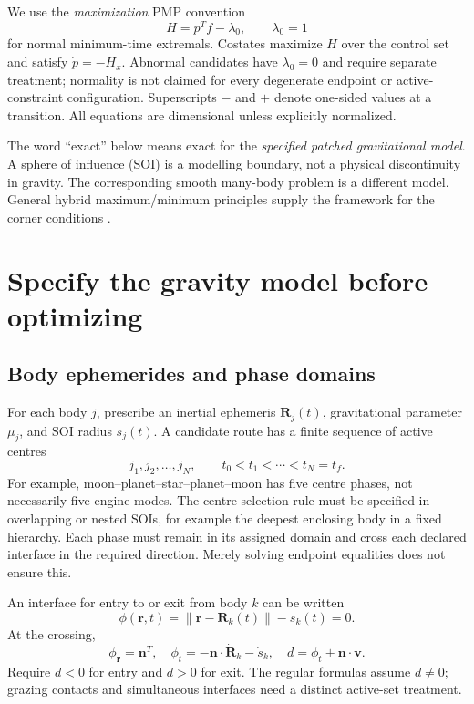 \documentclass[journal, a4paper]{IEEEtran}
\newcommand{\norm}[1]{\left\lVert#1\right\rVert}
\begin{document}
We use the \emph{maximization} PMP convention
\begin{equation}
 H=p^T f-\lambda_0,\qquad \lambda_0=1
 \label{eq:convention}
\end{equation}
for normal minimum-time extremals. Costates maximize $H$ over the control set and satisfy $\dot p=-H_x$. Abnormal candidates have $\lambda_0=0$ and require separate treatment; normality is not claimed for every degenerate endpoint or active-constraint configuration. Superscripts $-$ and $+$ denote one-sided values at a transition. All equations are dimensional unless explicitly normalized.

The word ``exact'' below means exact for the \emph{specified patched gravitational model}. A sphere of influence (SOI) is a modelling boundary, not a physical discontinuity in gravity. The corresponding smooth many-body problem is a different model. General hybrid maximum/minimum principles supply the framework for the corner conditions \cite{pakniyat,pakniyat2024}.

\section{Specify the gravity model before optimizing}
\subsection{Body ephemerides and phase domains}
For each body $j$, prescribe an inertial ephemeris $\mathbf R_j(t)$, gravitational parameter $\mu_j$, and SOI radius $s_j(t)$. A candidate route has a finite sequence of active centres
\begin{equation}
 j_1,j_2,\ldots,j_N,\qquad
 t_0<t_1<\cdots<t_N=t_f.
\end{equation}
For example, moon--planet--star--planet--moon has five centre phases, not necessarily five engine modes. The centre selection rule must be specified in overlapping or nested SOIs, for example the deepest enclosing body in a fixed hierarchy. Each phase must remain in its assigned domain and cross each declared interface in the required direction. Merely solving endpoint equalities does not ensure this.

An interface for entry to or exit from body $k$ can be written
\begin{equation}
 \phi(\mathbf r,t)=\norm{\mathbf r-\mathbf R_k(t)}-s_k(t)=0.
 \label{eq:surface}
\end{equation}
At the crossing,
\begin{equation}
 \phi_{\mathbf r}=\mathbf n^T,\quad
 \phi_t=-\mathbf n\cdot\dot{\mathbf R}_k-\dot s_k,\quad
 d=\phi_t+\mathbf n\cdot\mathbf v.
 \label{eq:crossrate}
\end{equation}
Require $d<0$ for entry and $d>0$ for exit. The regular formulas assume $d\ne0$; grazing contacts and simultaneous interfaces need a distinct active-set treatment.
\end{document}
